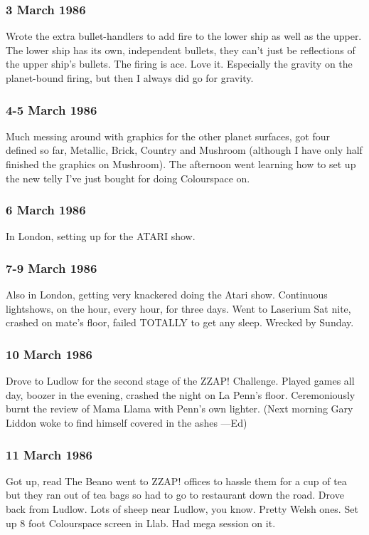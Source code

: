 \subsubsection{3 March 1986}
Wrote the extra bullet-handlers to add fire to the lower ship as well as the upper. The lower ship has its own, independent bullets, they can't just be reflections of the upper ship's bullets. The firing is ace. Love it. Especially the gravity on the planet-bound firing, but then I always did go for gravity.

\subsubsection{4-5 March 1986}
Much messing around with graphics for the other planet surfaces, got four defined so far, Metallic, Brick, Country and Mushroom (although I have only half finished the graphics on Mushroom). The afternoon went learning how to set up the new telly I've just bought for doing Colourspace on.

\subsubsection{6 March 1986}
In London, setting up for the ATARI show.

\subsubsection{7-9 March 1986}
Also in London, getting very knackered doing the Atari show. Continuous lightshows, on the hour, every hour, for three days. Went to Laserium Sat nite, crashed on mate's floor, failed TOTALLY to get any sleep. Wrecked by Sunday.

\subsubsection{10 March 1986}
Drove to Ludlow for the second stage of the ZZAP! Challenge. Played games all day, boozer in the evening, crashed the night on La Penn's floor. Ceremoniously burnt the review of Mama Llama with Penn's own lighter. (Next morning Gary Liddon woke to find himself covered in the ashes —Ed)

\subsubsection{11 March 1986}
Got up, read The Beano went to ZZAP! offices to hassle them for a cup of tea but they ran out of tea bags so had to go to restaurant down the road. Drove back from Ludlow. Lots of sheep near Ludlow, you know. Pretty Welsh ones. Set up 8 foot Colourspace screen in Llab. Had mega session on it.

